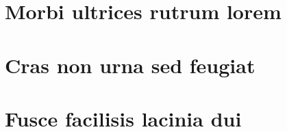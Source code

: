 
\begin{anexosenv}

\partanexos

\chapter{Morbi ultrices rutrum lorem}
\lipsum[30]

\chapter{Cras non urna sed feugiat}

\lipsum[31]

\chapter{Fusce facilisis lacinia dui}

\lipsum[32]

\end{anexosenv}

\printindex
